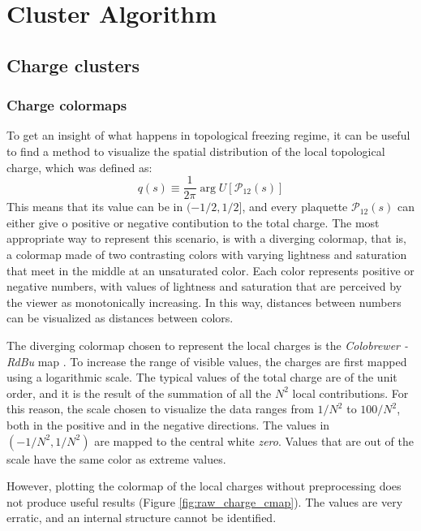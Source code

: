 \chapter{Cluster Algorithm}\label{ch:cluster}

\section{Charge clusters}

\subsection*{Charge colormaps}

To get an insight of what happens in topological freezing regime,
it can be useful to find a method to visualize the spatial distribution of the local topological charge,
which was defined as:
\[
    q(s) \equiv \frac{1}{2\pi}\arg U[\mathcal P_{12}(s)]
\]
This means that its value can be in $(-1/2,1/2]$,
and every plaquette $\mathcal P_{12}(s)$ can either give o positive or negative contibution to the total charge.
The most appropriate way to represent this scenario, is with a diverging colormap, that is,
a colormap made of two contrasting colors with varying lightness and saturation that meet in the middle at an unsaturated color.
Each color represents positive or negative numbers,
with values of lightness and saturation that are perceived by the viewer as monotonically increasing.
In this way, distances between numbers can be visualized as distances between colors.

The diverging colormap chosen to represent the local charges is the \emph{Colobrewer - RdBu} map \cite{colorbrewer}.
To increase the range of visible values, the charges are first mapped using a logarithmic scale.
The typical values of the total charge are of the unit order, and it is the result of the summation of all the $N^2$ local contributions.
For this reason, the scale chosen to visualize the data ranges from $1/N^2$ to $100/N^2$, both in the positive and in the negative directions.
The values in $(-1/N^2,1/N^2)$ are mapped to the central white \emph{zero}. Values that are out of the scale have the same color as extreme values.

However, plotting the colormap of the local charges without preprocessing does not produce useful results (Figure \ref{fig:raw_charge_cmap}).
The values are very erratic, and an internal structure cannot be identified.

